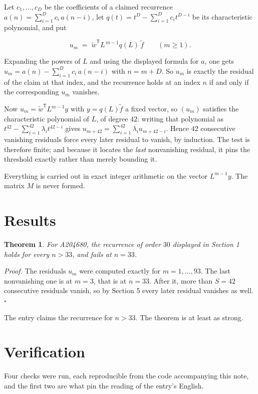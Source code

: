 \documentclass[11pt]{article}
\newtheorem{theorem}{Theorem}
\theoremstyle{definition}
\begin{document}
Let $c_1,\dots,c_D$ be the coefficients of a claimed recurrence $a(n) = \sum_{i=1}^{D} c_i\,a(n-i)$, let $q(t) = t^{D} - \sum_{i=1}^{D} c_i t^{D-i}$ be its characteristic polynomial, and put

\[u_m \;=\; \tilde w^{\mathsf T} L^{\,m-1} q(L)\,\tilde f \qquad (m \ge 1).\]

Expanding the powers of $L$ and using the displayed formula for $a$, one gets $u_m = a(n) - \sum_{i=1}^{D} c_i\,a(n-i)$ with $n = m + D$. So $u_m$ is exactly the residual of the claim at that index, and the recurrence holds at an index $n$ if and only if the corresponding $u_m$ vanishes.

Now $u_m = \tilde w^{\mathsf T} L^{m-1} y$ with $y = q(L)\tilde f$ a fixed vector, so $(u_m)$ satisfies the characteristic polynomial of $L$, of degree $42$: writing that polynomial as $t^{42} - \sum_{i=1}^{42} \lambda_i t^{42-i}$ gives $u_{m+42} = \sum_{i=1}^{42} \lambda_i u_{m+42-i}$. Hence $42$ consecutive vanishing residuals force every later residual to vanish, by induction. The test is therefore finite; and because it locates the {\itshape last} nonvanishing residual, it pins the threshold exactly rather than merely bounding it.

Everything is carried out in exact integer arithmetic on the vector $L^{m-1}y$. The matrix $M$ is never formed.

\section{Results}

\begin{theorem} For A204680, the recurrence of order $30$ displayed in Section 1 holds for every $n > 33$, and fails at $n = 33$.\end{theorem}

{\itshape Proof.} The residuals $u_m$ were computed exactly for $m = 1,\dots,93$. The last nonvanishing one is at $m = 3$, that is at $n = 33$. After it, more than $S = 42$ consecutive residuals vanish, so by Section 5 every later residual vanishes as well. $\square$

The entry claims the recurrence for $n > 33$. The theorem is at least as strong.

\section{Verification}

Four checks were run, each reproducible from the code accompanying this note, and the first two are what pin the reading of the entry's English.
\end{document}
